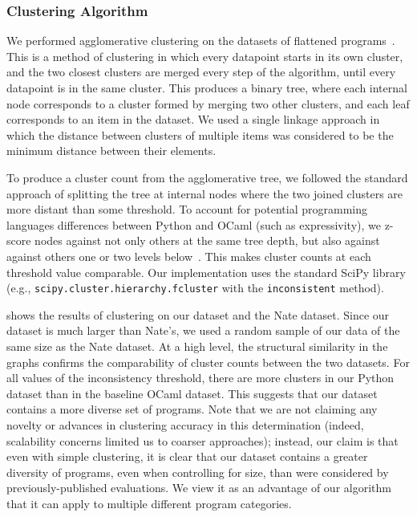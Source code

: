 \documentclass[conference]{IEEEtran}
\newcommand\lt[1]{{\lstinline|#1|}}
\begin{document}
\subsubsection{Clustering Algorithm}

We performed agglomerative clustering on the
datasets of flattened programs~\cite{modern-clustering}.
This is a method of clustering in which every datapoint starts in its own
cluster, and the two closest clusters are merged every step of the algorithm,
until every datapoint is in the same cluster. This produces a binary tree, where
each internal node corresponds to a cluster formed by merging two other clusters,
and each leaf corresponds to an item in the dataset. We used a single linkage
approach in which the distance between clusters of multiple items was considered
to be the minimum distance between their elements.

To produce a cluster count from the agglomerative tree, we followed the
standard approach of splitting the tree at internal nodes where the two
joined clusters are more distant than some threshold. To account for
potential programming languages differences between Python and OCaml (such
as expressivity), we z-score nodes against not only others at the same tree
depth, but also against against others one or two levels
below~\cite{inconsistent}. This makes cluster counts at each threshold
value comparable. Our implementation uses the standard
SciPy library (e.g., \lt{scipy.cluster.hierarchy.fcluster} with the
\lt{inconsistent} method).

 shows the results of clustering on our dataset and the
Nate dataset. Since our dataset is much larger than Nate's, we
used a random sample of our data of the same size as the Nate dataset.
At a high level, the structural similarity in the graphs
confirms the comparability of cluster counts between the two datasets.  For
all values of the inconsistency threshold, there are more clusters in our
Python dataset than in the baseline OCaml dataset. This suggests that our
dataset contains a more diverse set of programs. Note that we are not
claiming any novelty or advances in clustering accuracy in this
determination (indeed, scalability concerns limited us to coarser
approaches); instead, our claim is that even with simple clustering,
it is clear that our dataset contains a greater diversity of programs, even
when controlling for size, than were considered by previously-published
evaluations. We view it as an advantage of our algorithm that it can apply
to multiple different program categories.
\end{document}
